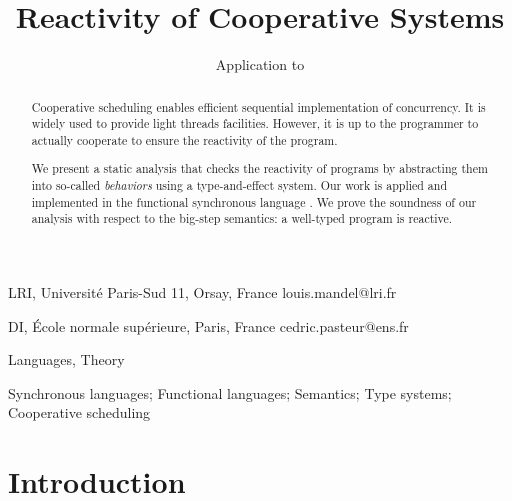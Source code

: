 \documentclass[9pt,preprint]{sigplanconf}
\begin{document}
\newtheorem{theorem}{Theorem}[section]
\newtheorem{property}{Property}
\newtheorem{lemma}{Lemma}
\newtheorem{hypothesis}{Hypothesis}

\theoremstyle{definition}
\newtheorem{definition}{Definition}

\title{Reactivity of Cooperative Systems}
\subtitle{Application to \rml}

{LRI, Universit\'e Paris-Sud 11, Orsay, France}
{louis.mandel@lri.fr}

{DI, \'Ecole normale sup\'erieure, Paris, France}
{cedric.pasteur@ens.fr}

\maketitle

\begin{abstract}
Cooperative scheduling enables efficient sequential implementation of concurrency. It is widely used to provide light threads facilities. However, it is up to the programmer to actually cooperate to ensure the reactivity of the program. 

We present a static analysis that checks the reactivity of programs by abstracting them into so-called \emph{behaviors} using a type-and-effect system. Our work is applied and implemented in the functional synchronous language \rml. We prove the soundness of our analysis with respect to the big-step semantics: a well-typed program is reactive.
\end{abstract}


\terms
Languages, Theory

\keywords
Synchronous languages; Functional languages;  Semantics; Type systems; Cooperative scheduling

\section{Introduction}
\label{sec:introduction}
\end{document}
